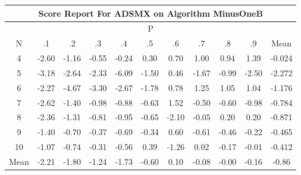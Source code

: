 \documentclass[11pt,a4paper]{report}
\begin{document}
\begin{longtable}{ | c || c | c | c | c | c | c | c | c | c || c |}
\hline
\multicolumn{11}{|c|}{ Score Report For ADSMX on Algorithm MinusOneB} \\
\hline
\multicolumn{11}{|c|}{ P } \\
\hline
N & .1 & .2 & .3 & .4 & .5 & .6 & .7 & .8 & .9 & Mean\\
 \hline
 \hline
 \endhead
  4 &  \cellcolor[HTML]{FFBFBF} -2.60 &  \cellcolor[HTML]{FFDFDF} -1.16 &  \cellcolor[HTML]{FFEFEF} -0.55 &  \cellcolor[HTML]{FFF7F7} -0.24 &  \cellcolor[HTML]{F7F7FF} 0.30 &  \cellcolor[HTML]{EFEFFF} 0.70 &  \cellcolor[HTML]{E7E7FF} 1.00 &  \cellcolor[HTML]{E7E7FF} 0.94 &  \cellcolor[HTML]{DFDFFF} 1.39 & -0.024 \\
  5 &  \cellcolor[HTML]{FFAFAF} -3.18 &  \cellcolor[HTML]{FFBFBF} -2.64 &  \cellcolor[HTML]{FFC7C7} -2.33 &  \cellcolor[HTML]{FF6868} -6.09 &  \cellcolor[HTML]{FFD7D7} -1.50 &  \cellcolor[HTML]{F7F7FF} 0.46 &  \cellcolor[HTML]{FFD7D7} -1.67 &  \cellcolor[HTML]{FFE7E7} -0.99 &  \cellcolor[HTML]{FFBFBF} -2.50 & -2.272 \\
  6 &  \cellcolor[HTML]{FFC7C7} -2.27 &  \cellcolor[HTML]{FF8787} -4.67 &  \cellcolor[HTML]{FFAFAF} -3.30 &  \cellcolor[HTML]{FFBFBF} -2.67 &  \cellcolor[HTML]{FFCFCF} -1.78 &  \cellcolor[HTML]{EFEFFF} 0.78 &  \cellcolor[HTML]{DFDFFF} 1.25 &  \cellcolor[HTML]{E7E7FF} 1.05 &  \cellcolor[HTML]{E7E7FF} 1.04 & -1.176 \\
  7 &  \cellcolor[HTML]{FFBFBF} -2.62 &  \cellcolor[HTML]{FFDFDF} -1.40 &  \cellcolor[HTML]{FFE7E7} -0.98 &  \cellcolor[HTML]{FFE7E7} -0.88 &  \cellcolor[HTML]{FFEFEF} -0.63 &  \cellcolor[HTML]{D7D7FF} 1.52 &  \cellcolor[HTML]{FFEFEF} -0.50 &  \cellcolor[HTML]{FFEFEF} -0.60 &  \cellcolor[HTML]{FFE7E7} -0.98 & -0.784 \\
  8 &  \cellcolor[HTML]{FFC7C7} -2.36 &  \cellcolor[HTML]{FFDFDF} -1.31 &  \cellcolor[HTML]{FFE7E7} -0.81 &  \cellcolor[HTML]{FFE7E7} -0.95 &  \cellcolor[HTML]{FFEFEF} -0.65 &  \cellcolor[HTML]{FFC7C7} -2.10 &  \cellcolor[HTML]{FFFFFF} -0.05 &  \cellcolor[HTML]{F7F7FF} 0.20 &  \cellcolor[HTML]{F7F7FF} 0.20 & -0.871 \\
  9 &  \cellcolor[HTML]{FFDFDF} -1.40 &  \cellcolor[HTML]{FFEFEF} -0.70 &  \cellcolor[HTML]{FFF7F7} -0.37 &  \cellcolor[HTML]{FFEFEF} -0.69 &  \cellcolor[HTML]{FFF7F7} -0.34 &  \cellcolor[HTML]{EFEFFF} 0.60 &  \cellcolor[HTML]{FFEFEF} -0.61 &  \cellcolor[HTML]{FFF7F7} -0.46 &  \cellcolor[HTML]{FFF7F7} -0.22 & -0.465 \\
  10 &  \cellcolor[HTML]{FFE7E7} -1.07 &  \cellcolor[HTML]{FFEFEF} -0.74 &  \cellcolor[HTML]{FFF7F7} -0.31 &  \cellcolor[HTML]{FFEFEF} -0.56 &  \cellcolor[HTML]{F7F7FF} 0.39 &  \cellcolor[HTML]{FFDFDF} -1.26 &  \cellcolor[HTML]{FFFFFF} 0.02 &  \cellcolor[HTML]{FFF7F7} -0.17 &  \cellcolor[HTML]{FFFFFF} -0.01 & -0.412 \\
 \hline
 \hline
Mean &  \cellcolor[HTML]{FFC7C7} -2.21 &  \cellcolor[HTML]{FFCFCF} -1.80 &  \cellcolor[HTML]{FFDFDF} -1.24 &  \cellcolor[HTML]{FFD7D7} -1.73 &  \cellcolor[HTML]{FFEFEF} -0.60 &  \cellcolor[HTML]{FFFFFF} 0.10 &  \cellcolor[HTML]{FFFFFF} -0.08 &  \cellcolor[HTML]{FFFFFF} -0.00 &  \cellcolor[HTML]{FFFFFF} -0.16 &  \cellcolor[HTML]{FFE7E7} -0.86
\end{longtable}
\end{document}
